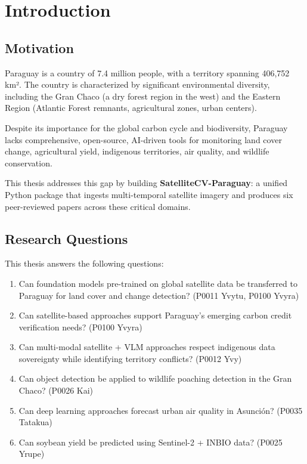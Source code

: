 
\chapter{Introduction}

\section{Motivation}

Paraguay is a country of 7.4 million people, with a territory spanning 406,752 km². The country is characterized by significant environmental diversity, including the Gran Chaco (a dry forest region in the west) and the Eastern Region (Atlantic Forest remnants, agricultural zones, urban centers).

Despite its importance for the global carbon cycle and biodiversity, Paraguay lacks comprehensive, open-source, AI-driven tools for monitoring land cover change, agricultural yield, indigenous territories, air quality, and wildlife conservation.

This thesis addresses this gap by building \textbf{SatelliteCV-Paraguay}: a unified Python package that ingests multi-temporal satellite imagery and produces six peer-reviewed papers across these critical domains.

\section{Research Questions}

This thesis answers the following questions:

\begin{enumerate}
    \item Can foundation models pre-trained on global satellite data be transferred to Paraguay for land cover and change detection? (P0011 Yvytu, P0100 Yvyra)
    \item Can satellite-based approaches support Paraguay's emerging carbon credit verification needs? (P0100 Yvyra)
    \item Can multi-modal satellite + VLM approaches respect indigenous data sovereignty while identifying territory conflicts? (P0012 Yvy)
    \item Can object detection be applied to wildlife poaching detection in the Gran Chaco? (P0026 Kai)
    \item Can deep learning approaches forecast urban air quality in Asunción? (P0035 Tatakua)
    \item Can soybean yield be predicted using Sentinel-2 + INBIO data? (P0025 Yrupe)
\end{enumerate}

